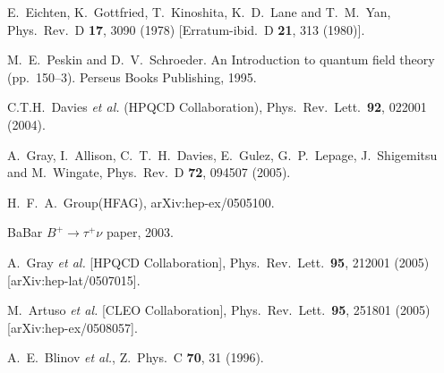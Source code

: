 \documentclass{cornell}
\begin{document}
\begin{thebibliography}{99}

E.~Eichten, K.~Gottfried, T.~Kinoshita, K.~D.~Lane and T.~M.~Yan,
  Phys.\ Rev.\ D {\bf 17}, 3090 (1978)
  [Erratum-ibid.\ D {\bf 21}, 313 (1980)].

M.~E.~Peskin and D.~V.~Schroeder.
An Introduction to quantum field theory (pp.\ 150--3). Perseus Books Publishing, 1995.

C.T.H.~Davies {\it et al.}  (HPQCD Collaboration),
Phys.\ Rev.\ Lett.\  {\bf 92}, 022001 (2004).

A.~Gray, I.~Allison, C.~T.~H.~Davies, E.~Gulez, G.~P.~Lepage, J.~Shigemitsu and M.~Wingate,
Phys.\ Rev.\ D {\bf 72}, 094507 (2005).

H.~F.~A.~Group(HFAG),
  arXiv:hep-ex/0505100.

BaBar $B^+ \to \tau^+ \nu$ paper, 2003.

A.~Gray {\it et al.}  [HPQCD Collaboration],
  Phys.\ Rev.\ Lett.\  {\bf 95}, 212001 (2005)
  [arXiv:hep-lat/0507015].

M.~Artuso {\it et al.}  [CLEO Collaboration],
  Phys.\ Rev.\ Lett.\  {\bf 95}, 251801 (2005)
  [arXiv:hep-ex/0508057].

A.~E.~Blinov {\it et al.},
  Z.\ Phys.\ C {\bf 70}, 31 (1996).


\end{thebibliography}
\end{document}
